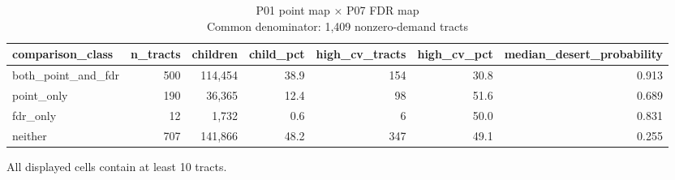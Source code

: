 \begin{table}[t]
\caption*{
{\fontsize{20}{25}\selectfont  P01 point map × P07 FDR map\fontsize{12}{15}\selectfont } \\ 
{\fontsize{14}{17}\selectfont  Common denominator: 1,409 nonzero-demand tracts\fontsize{12}{15}\selectfont }
} 
\fontsize{12.0pt}{14.0pt}\selectfont
\begin{tabular*}{\linewidth}{@{\extracolsep{\fill}}lrrrrrr}
\toprule
comparison\_class & n\_tracts & children & child\_pct & high\_cv\_tracts & high\_cv\_pct & median\_desert\_probability \\ 
\midrule\addlinespace[2.5pt]
both\_point\_and\_fdr & 500 & 114,454 & 38.9 & 154 & 30.8 & 0.913 \\ 
point\_only & 190 & 36,365 & 12.4 & 98 & 51.6 & 0.689 \\ 
fdr\_only & 12 & 1,732 & 0.6 & 6 & 50.0 & 0.831 \\ 
neither & 707 & 141,866 & 48.2 & 347 & 49.1 & 0.255 \\ 
\bottomrule
\end{tabular*}
\begin{minipage}{\linewidth}
\vspace{.05em}
All displayed cells contain at least 10 tracts.\\
\end{minipage}
\end{table}

